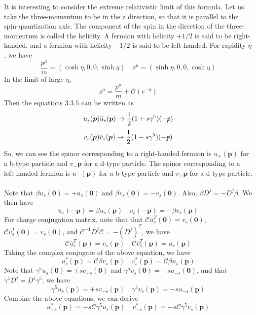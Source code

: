 It is interesting to consider the extreme relativistic limit of this formula. Let us take the three-momentum to be in the z direction, so that it is parallel to the spin-quantization axis. The component of the spin in the direction of the three-momentum is called the helicity. A fermion with helicity $+1/2$ is said to be right-handed, and a fermion with helicity $-1/2$ is said to be
left-handed. For rapidity $\eta$, we have
\[\frac{p^{\mu}}{m} = (\cosh \eta, 0, 0, \sinh \eta) \quad z^{\mu} = (\sinh \eta, 0, 0, \cosh \eta)\]
In the limit of large $\eta$,
\[z^{\mu} = \frac{p^{\mu}}{m} + \mathcal{O}(e^{-\eta})\]
Then the equations $3.3.5$ can be written as
\[u_s(\bm{p}) \overline{u}_s(\bm{p})  \to \frac{1}{2}(1+s\gamma^5)(-\slashed{p})\]
\[v_s(\bm{p}) \overline{v}_s(\bm{p})  \to \frac{1}{2}(1-s\gamma^5)(-\slashed{p})\]
So, we can see the spinor corresponding to a right-handed fermion  is $u_+(\bm{p})$ for a b-type particle and $v_-{\bm{p}}$ for a d-type particle.  The spinor corresponding to a left-handed fermion  is $u_-(\bm{p})$ for a b-type particle and $v_+{\bm{p}}$ for a d-type particle.\\ \\
Note that $\beta u_s(\bm{0}) = + u_s(\bm{0})$ and $\beta v_s(\bm{0}) = -v_s(\bm{0})$. Also, $\beta D^j = - D^j \beta$. We then have
\[u_s(-\bm{p}) = \beta u_s(\bm{p}) \quad v_s(-\bm{p}) = -\beta v_s(\bm{p})\]
For charge conjugation matrix, note that that $\mathcal{C} \overline{u}^T_s(\bm{0}) = v_s(\bm{0})$, $\mathcal{C} \overline{v}^T_s(\bm{0}) = v_s(\bm{0})$, and $\mathcal{C}^{-1} D^j \mathcal{C} = - (D^j)^T$, we have
\[\mathcal{C} \overline{u}^T_s(\bm{p}) = v_s(\bm{p}) \quad \mathcal{C} \overline{v}^T_s(\bm{p}) = u_s(\bm{p})\]
Taking the complex conjugate of the above equation, we have
\[u^*_s(\bm{p}) = \mathcal{C}\beta v_s(\bm{p}) \quad v^*_s(\bm{p}) = \mathcal{C}\beta u_s(\bm{p})\]
Note that $\gamma^5 u_{s}(\bm{0}) = +s v_{-s}(\bm{0})$ and $\gamma^5 v_{s}(\bm{0}) = -s u_{-s}(\bm{0})$, and that $\gamma^5 D^j = D^j \gamma^5$, we have
\[\gamma^5 u_{s}(\bm{p}) = +s v_{-s}(\bm{p}) \quad \gamma^5 v_{s}(\bm{p}) = -s u_{-s}(\bm{p})\]
Combine the above equations, we can derive
\[u^*_{-s}(\bm{p}) = -s\mathcal{C}\gamma^5 u_s(\bm{p}) \quad v^*_{-s}(\bm{p}) = -s\mathcal{C}\gamma^5 v_s(\bm{p})\]

